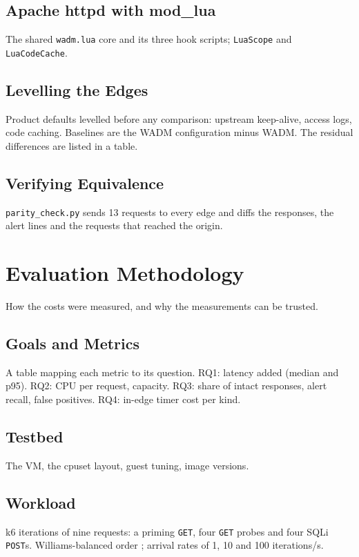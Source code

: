 \documentclass{rptuma}
\begin{document}
\section{Apache httpd with mod\_lua}
The shared \texttt{wadm.lua} core and its three hook scripts; \texttt{LuaScope} and
\texttt{LuaCodeCache}.

\section{Levelling the Edges}
\label{sec:AB.level}
Product defaults levelled before any comparison: upstream keep-alive, access logs, code caching.
Baselines are the WADM configuration minus WADM. The residual differences are listed in a table.

\section{Verifying Equivalence}
\texttt{parity\_check.py} sends 13 requests to every edge and diffs the responses, the alert lines
and the requests that reached the origin.

\chapter{Evaluation Methodology}
How the costs were measured, and why the measurements can be trusted.

\section{Goals and Metrics}
\label{sec:AB.metrics}
A table mapping each metric to its question. RQ1: latency added (median and p95). RQ2: CPU per
request, capacity. RQ3: share of intact responses, alert recall, false positives. RQ4: in-edge
timer cost per kind.

\section{Testbed}
The VM, the cpuset layout, guest tuning, image versions.

\section{Workload}
k6 iterations of nine requests: a priming \texttt{GET}, four \texttt{GET} probes and four SQLi
\texttt{POST}s. Williams-balanced order \cite{williams1949designs}; arrival rates of 1, 10 and 100
iterations/s.
\end{document}
